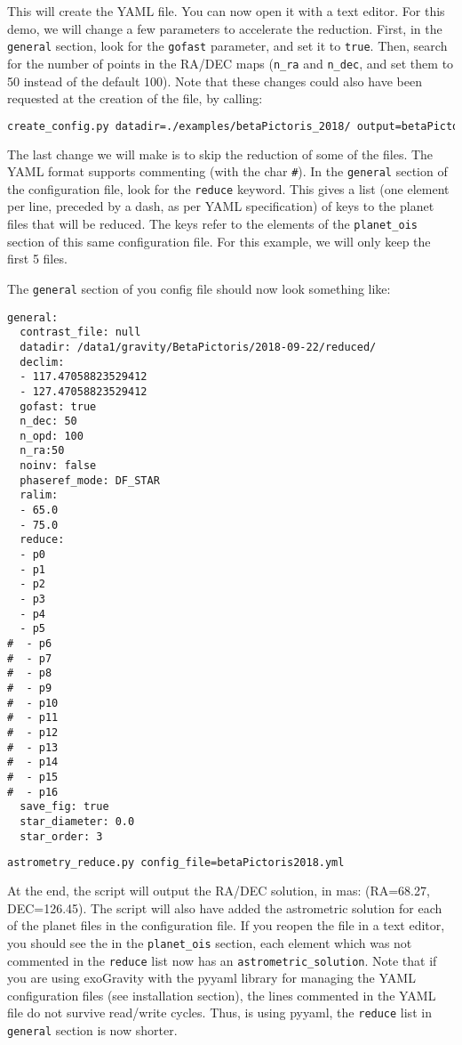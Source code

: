 This will create the YAML file. You can now open it with a text editor. For this demo, we will change a few parameters to accelerate the reduction. First, in the \verb|general| section, look for the \verb|gofast| parameter, and set it to \verb|true|. Then, search for the number of points in the RA/DEC maps (\verb|n_ra| and \verb|n_dec|, and set them to 50 instead of the default 100). Note that these changes could also have been requested at the creation of the file, by calling:
\begin{lstlisting}[language=bash]
create_config.py datadir=./examples/betaPictoris_2018/ output=betaPictoris2018.yml gofast=True nra=50 ndec=50
\end{lstlisting}

\noindent{}The last change we will make is to skip the reduction of some of the files. The YAML format supports commenting (with the char \verb|#|). In the \verb|general| section of the configuration file, look for the \verb|reduce| keyword. This gives a list (one element per line, preceded by a dash, as per YAML specification) of keys to the planet files that will be reduced. The keys refer to the elements of the \verb|planet_ois| section of this same configuration file. For this example, we will only keep the first 5 files.

\noindent{}The \verb|general| section of you config file should now look something like:
\begin{verbatim}
general:
  contrast_file: null
  datadir: /data1/gravity/BetaPictoris/2018-09-22/reduced/
  declim:
  - 117.47058823529412
  - 127.47058823529412
  gofast: true
  n_dec: 50
  n_opd: 100
  n_ra:50
  noinv: false
  phaseref_mode: DF_STAR
  ralim:
  - 65.0
  - 75.0
  reduce:
  - p0
  - p1
  - p2
  - p3
  - p4
  - p5
#  - p6
#  - p7
#  - p8
#  - p9
#  - p10
#  - p11
#  - p12
#  - p13
#  - p14
#  - p15
#  - p16
  save_fig: true
  star_diameter: 0.0
  star_order: 3
\end{verbatim}

\begin{lstlisting}[language=bash]
astrometry_reduce.py config_file=betaPictoris2018.yml
\end{lstlisting}
\noindent{}At the end, the script will output the RA/DEC solution, in mas: (RA=68.27, DEC=126.45). The script will also have added the astrometric solution for each of the planet files in the configuration file. If you reopen the file in a text editor, you should see the in the \verb|planet_ois| section, each element which was not commented in the \verb|reduce| list now has an \verb|astrometric_solution|. Note that if you are using exoGravity with the pyyaml library for managing the YAML configuration files (see installation section), the lines commented in the YAML file do not survive read/write cycles. Thus, is using pyyaml, the \verb|reduce| list in \verb|general| section is now shorter.

